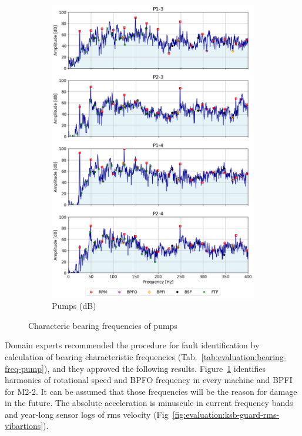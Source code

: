 \begin{figure}[h]
\begin{subfigure}[b]{0.24\textwidth}
        \includegraphics[width=\textwidth]{assets/results/defects/pumps-dB.png}
        \caption{Pumps (dB)}
    \end{subfigure}
    \caption{Characteric bearing frequencies of pumps}
    \label{fig:evaluation:bearing-freq}
\end{figure}

Domain experts recommended the procedure for fault identification by calculation of bearing characteristic frequencies (Tab.~\ref{tab:evaluation:bearing-freq-pump}), and they approved the following results. Figure~\ref{fig:evaluation:bearing-freq} identifies harmonics of rotational speed and BPFO frequency in every machine and BPFI for M2-2. It can be assumed that those frequencies will be the reason for damage in the future. The absolute acceleration is minuscule in current frequency bands and year-long sensor logs of rms velocity (Fig~\ref{fig:evaluation:ksb-guard-rms-vibartions}).


